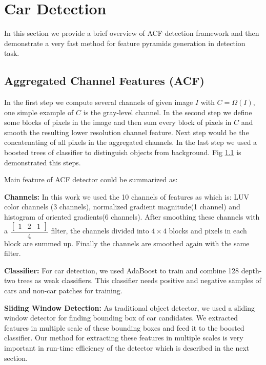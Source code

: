 \documentclass[conference]{IEEEtran}
\begin{document}
\section{Car Detection}
In this section we provide a brief overview of ACF detection framework \cite{dollar2010fastest} and then demonstrate a very fast method for feature pyramids generation \cite{dollar2014fast} in detection task.
\subsection{Aggregated Channel Features (ACF)}
In the first step we compute several channels of given image $I$ with $C=\Omega({I})$, one simple example of $C$ is the gray-level channel. In the second step we define some blocks of pixels in the image and then sum every block of pixels in $C$ and smooth the resulting lower resolution channel feature. Next step would be the concatenating of all pixels in the aggregated channels. In the last step we used a boosted trees of classifier to distinguish objects from background. Fig \ref{} is demonstrated this steps. 

Main feature of ACF detector could be summarized as:

\textbf{Channels:} In this work we used the 10 channels of features as \cite{dollar2010fastest} which is: LUV color channels (3 channels), normalized gradient magnitude(1 channel) and histogram of oriented gradients(6 channels). After smoothing these channels with a 
$  \dfrac{\begin{bmatrix}
	1&2&1
	\end{bmatrix}}{4} $ filter, 
the channels divided into $4 \times 4$ blocks and pixels in each block are summed up. Finally the channels are smoothed again with the same filter.

\textbf{Classifier:} For car detection, we used AdaBoost \cite{friedman2000additive} to train and combine 128 depth-two trees as weak classifiers. This classifier needs positive and negative samples of cars and non-car patches for training.

\textbf{Sliding Window Detection:} As traditional object detector, we used a sliding window detector for finding bounding box of car candidates. We extracted features in multiple scale of these bounding boxes and feed it to the boosted classifier. Our method for extracting these features in multiple scales is very important in run-time efficiency of the detector which is described in the next section.
\end{document}
